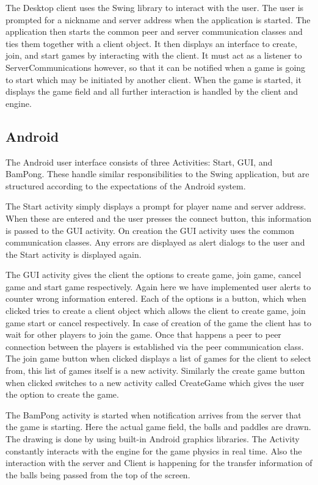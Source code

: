 \documentclass{sig-alternate}
\begin{document}
The Desktop client uses the Swing library to interact with the user.  The
user is prompted for a nickname and server address when the application is
started.  The application then starts the common peer and server
communication classes and ties them together with a client object.  It then
displays an interface to create, join, and start games by interacting with
the client.  It must act as a listener to ServerCommunications however, so
that it can be notified when a game is going to start which may be
initiated by another client.  When the game is started, it displays the
game field and all further interaction is handled by the client and engine.

\subsection{Android}

The Android user interface consists of three Activities:  Start, GUI, and
BamPong.   These handle similar responsibilities to the Swing application,
but are structured according to the expectations of the Android system.

The Start activity simply displays a prompt for player name and server
address.  When these are entered and the user presses the connect button,
this information is passed to the GUI activity.  On creation the GUI
activity uses the common communication classes.  Any errors are displayed
as alert dialogs to the user and the Start activity is displayed again.

The GUI activity gives the client the options to create game, join game,
cancel game and start game respectively.  Again here we have implemented
user alerts to counter wrong information entered.  Each of the options is a
button, which when clicked tries to create a client object which allows the
client to create game, join game start or cancel respectively.  In case of
creation of the game the client has to wait for other players to join the
game.  Once that happens a peer to peer connection between the players is
established via the peer communication class.  The join game button when
clicked displays a list of games for the client to select from, this list
of games itself is a new activity.  Similarly the create game button when
clicked switches to a new activity called CreateGame which gives the user
the option to create the game.

The BamPong activity is started when notification arrives from the server
that the game is starting.  Here the actual game field, the balls and
paddles are drawn.  The drawing is done by using built-in Android graphics
libraries.  The Activity constantly interacts with the engine for the game
physics in real time.  Also the interaction with the server and Client is
happening for the transfer information of the balls being passed from the
top of the screen.
\end{document}
